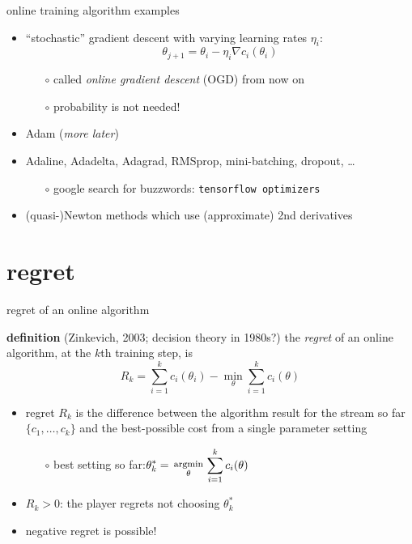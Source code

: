 \documentclass[xcolor={svgnames},
               hyperref={colorlinks,citecolor=DeepPink4,linkcolor=FireBrick,urlcolor=Maroon}]
               {beamer}
\newcommand{\grad}{\nabla}
\newcommand{\ds}{\displaystyle}
\begin{document}
\begin{frame}{online training algorithm examples}

\begin{itemize}
\item ``stochastic'' gradient descent with varying learning rates $\eta_i$:
   $$\theta_{j+1} = \theta_i - \eta_i \grad c_i(\theta_i)$$

    \begin{itemize}
    \item[$\circ$] called \emph{online gradient descent} (OGD) from now on
    \item[$\circ$] probability is not needed!
    \end{itemize}
\item Adam (\emph{more later})
\item Adaline, Adadelta, Adagrad, RMSprop, mini-batching, dropout, \dots
    \begin{itemize}
    \item[$\circ$] google search for buzzwords: \quad \texttt{tensorflow optimizers}
    \end{itemize}
\item (quasi-)Newton methods which use (approximate) 2nd derivatives
\end{itemize}
\end{frame}


\section{regret}

\begin{frame}{regret of an online algorithm}

\begin{block}{\textbf{definition} (Zinkevich, 2003; decision theory in 1980s?)}
the \emph{regret} of an online algorithm, at the $k$th training step, is
    $$R_k = \sum_{i=1}^k c_i(\theta_i) - \min_\theta \sum_{i=1}^k c_i(\theta)$$
\end{block}

\begin{itemize}
\item regret $R_k$ is the difference between the algorithm result for the stream so far $\{c_1,\dots,c_k\}$ and the best-possible cost from a single parameter setting
    \begin{itemize}
    \item[$\circ$] best setting so far:\quad  $\ds \theta_k^* = \begin{smallmatrix} \phantom{x} \\ \text{\footnotesize argmin} \\ \theta \end{smallmatrix} \sum_{i=1}^k c_i(\theta)$
    \end{itemize}

\smallskip
\item $R_k>0$: the player regrets not choosing $\theta_k^*$
\item negative regret is possible!
\end{itemize}
\end{frame}
\end{document}
